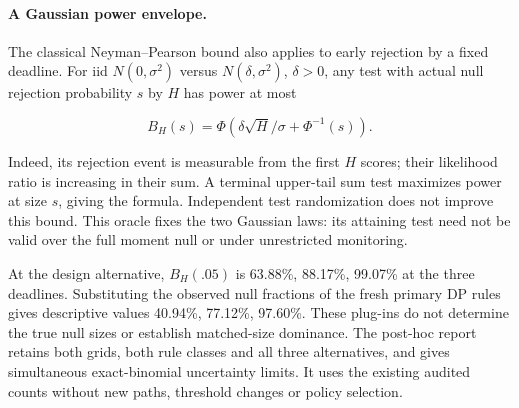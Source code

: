 \paragraph{A Gaussian power envelope.}

The classical Neyman--Pearson bound \cite{neymanpearson} also applies to early rejection by a fixed deadline. For iid $N(0,\sigma^2)$ versus $N(\delta,\sigma^2)$, $\delta>0$, any test with actual null rejection probability $s$ by $H$ has power at most

\[B_H(s)=\Phi\!\left(\delta\sqrt H/\sigma+\Phi^{-1}(s)\right).\]

Indeed, its rejection event is measurable from the first $H$ scores; their likelihood ratio is increasing in their sum. A terminal upper-tail sum test maximizes power at size $s$, giving the formula. Independent test randomization does not improve this bound. This oracle fixes the two Gaussian laws: its attaining test need not be valid over the full moment null or under unrestricted monitoring.

At the design alternative, $B_H(.05)$ is 63.88\%, 88.17\%, 99.07\% at the three deadlines. Substituting the observed null fractions of the fresh primary DP rules gives descriptive values 40.94\%, 77.12\%, 97.60\%. These plug-ins do not determine the true null sizes or establish matched-size dominance. The post-hoc report retains both grids, both rule classes and all three alternatives, and gives simultaneous exact-binomial uncertainty limits. It uses the existing audited counts without new paths, threshold changes or policy selection.
